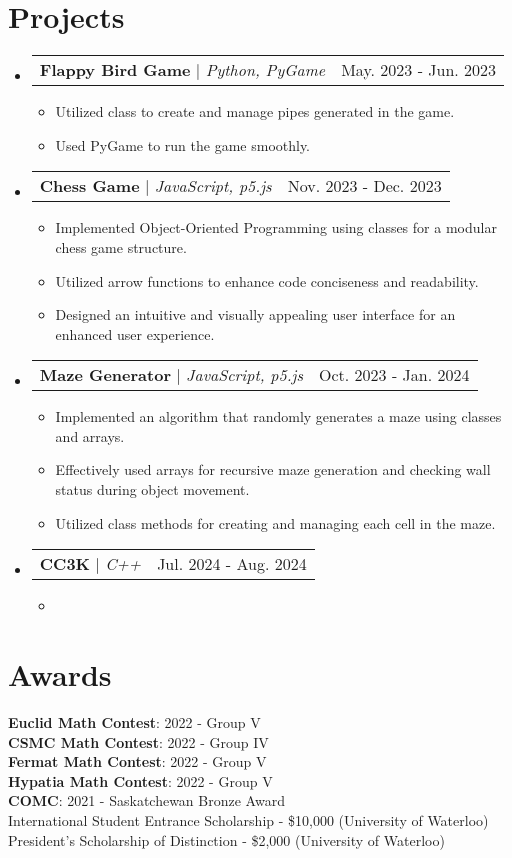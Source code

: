 \documentclass[letterpaper,11pt]{article}
\makeatletter
\newcommand{\resumeItem}[1]{
\item\small{
    {#1 \vspace{-2pt}}
}
}
\newcommand{\resumeProjectHeading}[2]{
    \item
    \begin{tabular*}{0.97\textwidth}{l@{\extracolsep{\fill}}r}
    \small#1 & #2 \\
    \end{tabular*}\vspace{-7pt}
}
\newcommand{\resumeSubHeadingListStart}{\begin{itemize}[leftmargin=0.3in, label={}]}
\newcommand{\resumeSubHeadingListEnd}{\end{itemize}}
\newcommand{\resumeItemListStart}{\begin{itemize}}
\newcommand{\resumeItemListEnd}{\end{itemize}\vspace{-5pt}}
\makeatother
\begin{document}
\section{Projects}
    \resumeSubHeadingListStart
    \resumeProjectHeading
        {\textbf{Flappy Bird Game} $|$ \emph{Python, PyGame}}{May. 2023 - Jun. 2023}
        \resumeItemListStart
            \resumeItem{Utilized class to create and manage pipes generated in the game.}
            \resumeItem{Used PyGame to run the game smoothly.}
        \resumeItemListEnd
    \resumeProjectHeading
        {\textbf{Chess Game} $|$ \emph{JavaScript, p5.js}}{Nov. 2023 - Dec. 2023}
        \resumeItemListStart
            \resumeItem{Implemented Object-Oriented Programming using classes for a modular chess game structure.}
            \resumeItem{Utilized arrow functions to enhance code conciseness and readability.}
            \resumeItem{Designed an intuitive and visually appealing user interface for an enhanced user experience.}
        \resumeItemListEnd
    \resumeProjectHeading
        {\textbf{Maze Generator} $|$ \emph{JavaScript, p5.js}}{Oct. 2023 - Jan. 2024}
        \resumeItemListStart
            \resumeItem{Implemented an algorithm that randomly generates a maze using classes and arrays.}
            \resumeItem{Effectively used arrays for recursive maze generation and checking wall status during object movement.}
            \resumeItem{Utilized class methods for creating and managing each cell in the maze.}
        \resumeItemListEnd
    \resumeProjectHeading
        {\textbf{CC3K} $|$ \emph{C++}}{Jul. 2024 - Aug. 2024}
        \resumeItemListStart
            \resumeItem{}
        \resumeItemListEnd

    \resumeSubHeadingListEnd



\section{Awards}
\begin{itemize}[leftmargin=0.15in, label={}]
    \small{\item{
    \textbf{Euclid Math Contest}{: 2022 - Group V} \\
    \textbf{CSMC Math Contest}{: 2022 - Group IV} \\
    \textbf{Fermat Math Contest}{: 2022 - Group V} \\
    \textbf{Hypatia Math Contest}{: 2022 - Group V} \\
    \textbf{COMC}{: 2021 - Saskatchewan Bronze Award} \\
    {International Student Entrance Scholarship - \$10,000 (University of Waterloo)} \\
    {President's Scholarship of Distinction - \$2,000 (University of Waterloo)}
    }}
\end{itemize}
\end{document}
